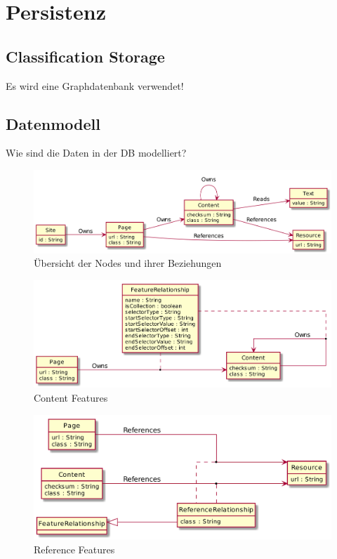 \section{Persistenz}
    \subsection{Classification Storage}
        Es wird eine Graphdatenbank verwendet!

    \subsection{Datenmodell}
        Wie sind die Daten in der DB modelliert?

        \begin{figure}
            \centering
            \includegraphics[width=\textwidth]{../resources/db-data-model/nodes.png}
            \caption{Übersicht der Nodes und ihrer Beziehungen}
            \label{image:dbDataModelOverview}
        \end{figure}

        \begin{figure}
            \centering
            \includegraphics[width=\textwidth]{../resources/db-data-model/content-relationship.png}
            \caption{Content Features}
            \label{image:dbDataModelContentRelationship}
        \end{figure}

        \begin{figure}
            \centering
            \includegraphics[width=\textwidth]{../resources/db-data-model/resource-relationship.png}
            \caption{Reference Features}
            \label{image:dbDataModelResourceRelationship}
        \end{figure}

